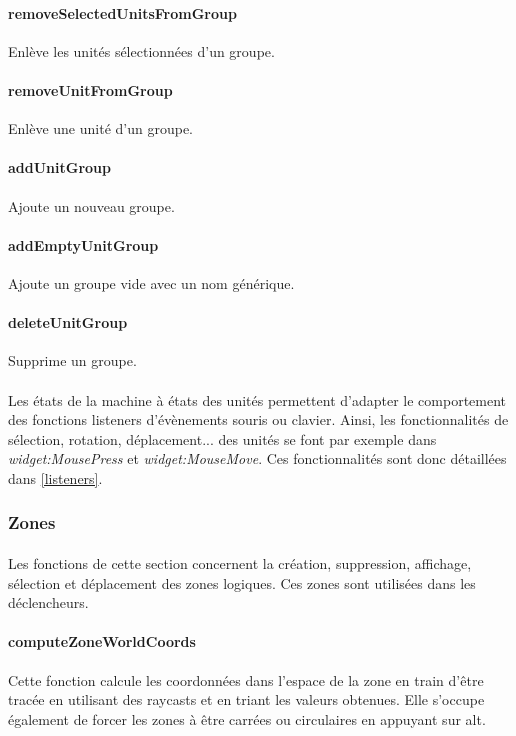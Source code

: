 \documentclass[a4paper]{article}
\begin{document}
\paragraph{removeSelectedUnitsFromGroup} Enlève les unités sélectionnées d'un groupe.
\paragraph{removeUnitFromGroup} Enlève une unité d'un groupe.
\paragraph{addUnitGroup} Ajoute un nouveau groupe.
\paragraph{addEmptyUnitGroup} Ajoute un groupe vide avec un nom générique.
\paragraph{deleteUnitGroup} Supprime un groupe.
\paragraph{} Les états de la machine à états des unités permettent d'adapter le comportement des fonctions listeners d'évènements souris ou clavier. Ainsi, les fonctionnalités de sélection, rotation, déplacement... des unités se font par exemple dans \textit{widget:MousePress} et \textit{widget:MouseMove}. Ces fonctionnalités sont donc détaillées dans \ref{listeners}.
\subsubsection{Zones}
\paragraph{}
Les fonctions de cette section concernent la création, suppression, affichage, sélection et déplacement des zones logiques. Ces zones sont utilisées dans les déclencheurs.
\paragraph{computeZoneWorldCoords} Cette fonction calcule les coordonnées dans l'espace de la zone en train d'être tracée en utilisant des raycasts et en triant les valeurs obtenues. Elle s'occupe également de forcer les zones à être carrées ou circulaires en appuyant sur alt.
\end{document}

